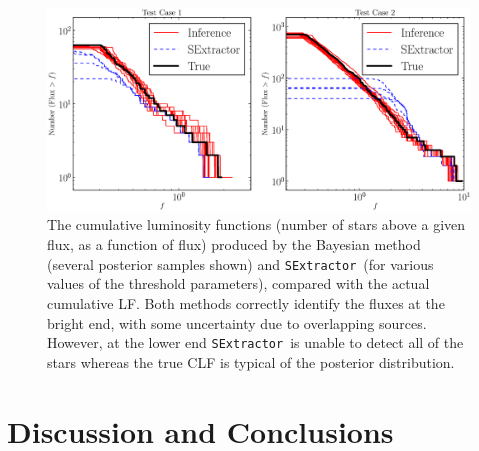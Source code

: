 \documentclass[12pt, preprint]{aastex}
\newcommand{\sex}{{\tt SExtractor}}
\begin{document}
\begin{figure}[ht!]
\begin{center}
\includegraphics[scale=0.5]{Figures/luminosity_function.eps}
\end{center}
\caption{The cumulative luminosity functions (number of stars above a given
flux, as a function of flux) produced by the Bayesian method
(several posterior samples shown)
and
\sex~(for various values of the threshold parameters), compared with the
actual cumulative LF. Both methods correctly identify the fluxes at the bright
end, with some uncertainty due to overlapping sources. However, at the lower
end \sex~is unable to detect all of the stars whereas the true CLF is typical
of the posterior distribution.
\label{fig:luminosity_function}}
\end{figure}

\section{Discussion and Conclusions}\label{sec:conclusion}
\end{document}

